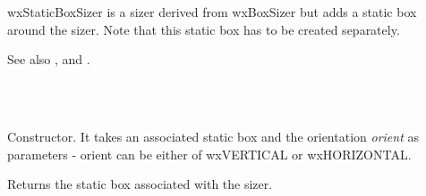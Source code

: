 \section{}\label{wxstaticboxsizer}

wxStaticBoxSizer is a sizer derived from wxBoxSizer but adds a static
box around the sizer. Note that this static box has to be created 
separately.

See also ,  and
 .


\\
\\


\label{wxstaticboxsizerwxstaticboxsizer}


Constructor. It takes an associated static box and the orientation {\it orient}
as parameters - orient can be either of wxVERTICAL or wxHORIZONTAL.

\label{wxstaticboxsizergetstaticbox}


Returns the static box associated with the sizer.

